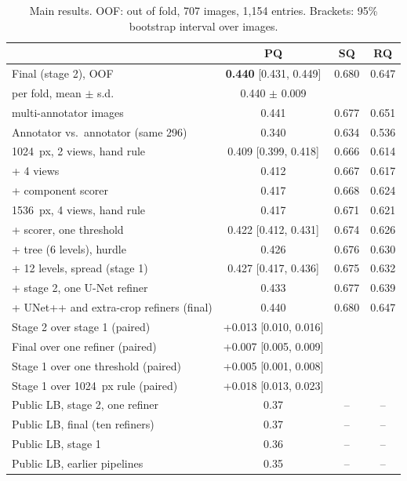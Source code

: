 \documentclass[sigconf]{acmart}
\begin{document}
\begin{table}[t]
\centering
\caption{Main results. OOF: out of fold, 707 images, 1{,}154 entries. Brackets: 95\% bootstrap interval over images.}
\label{tab:main}
\small\setlength{\tabcolsep}{3pt}
\begin{tabular}{@{}lccc@{}}
\toprule
 & PQ & SQ & RQ \\
\midrule
Final (stage 2), OOF & \textbf{0.440} [0.431, 0.449] & 0.680 & 0.647 \\
\quad per fold, mean $\pm$ s.d. & 0.440 $\pm$ 0.009 & & \\
\quad 296 multi-annotator images & 0.441 & 0.677 & 0.651 \\
Annotator vs.\ annotator (same 296) & 0.340 & 0.634 & 0.536 \\
\midrule
1024~px, 2 views, hand rule & 0.409 [0.399, 0.418] & 0.666 & 0.614 \\
\quad + 4 views & 0.412 & 0.667 & 0.617 \\
\quad + component scorer & 0.417 & 0.668 & 0.624 \\
1536~px, 4 views, hand rule & 0.417 & 0.671 & 0.621 \\
\quad + scorer, one threshold & 0.422 [0.412, 0.431] & 0.674 & 0.626 \\
\quad + tree (6 levels), hurdle & 0.426 & 0.676 & 0.630 \\
\quad + 12 levels, spread (stage 1) & 0.427 [0.417, 0.436] & 0.675 & 0.632 \\
\quad + stage 2, one U-Net refiner & 0.433 & 0.677 & 0.639 \\
\quad + UNet++ and extra-crop refiners (final) & 0.440 & 0.680 & 0.647 \\
Stage 2 over stage 1 (paired) & +0.013 [0.010, 0.016] & & \\
Final over one refiner (paired) & +0.007 [0.005, 0.009] & & \\
Stage 1 over one threshold (paired) & +0.005 [0.001, 0.008] & & \\
Stage 1 over 1024~px rule (paired) & +0.018 [0.013, 0.023] & & \\
\midrule
Public LB, stage 2, one refiner & 0.37 & -- & -- \\
Public LB, final (ten refiners) & 0.37 & -- & -- \\
Public LB, stage 1 & 0.36 & -- & -- \\
Public LB, earlier pipelines & 0.35 & -- & -- \\
\bottomrule
\end{tabular}
\end{table}
\end{document}
